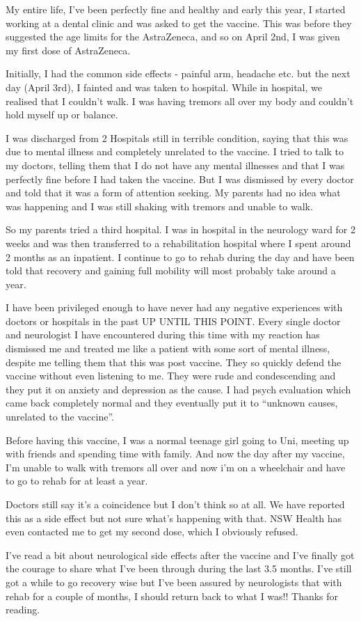 My entire life, I’ve been perfectly fine and healthy and early this year, I
started working at a dental clinic and was asked to get the vaccine. This was
before they suggested the age limits for the AstraZeneca, and so on April 2nd, I
was given my first dose of AstraZeneca.

Initially, I had the common side effects - painful arm, headache etc. but the
next day (April 3rd), I fainted and was taken to hospital. While in hospital, we
realised that I couldn’t walk. I was having tremors all over my body and
couldn’t hold myself up or balance.

I was discharged from 2 Hospitals still in terrible condition, saying that this
was due to mental illness and completely unrelated to the vaccine. I tried to
talk to my doctors, telling them that I do not have any mental illnesses and
that I was perfectly fine before I had taken the vaccine. But I was dismissed by
every doctor and told that it was a form of attention seeking. My parents had no
idea what was happening and I was still shaking with tremors and unable to
walk.

So my parents tried a third hospital. I was in hospital in the neurology ward
for 2 weeks and was then transferred to a rehabilitation hospital where I spent
around 2 months as an inpatient. I continue to go to rehab during the day and
have been told that recovery and gaining full mobility will most probably take
around a year.

I have been privileged enough to have never had any negative experiences with
doctors or hospitals in the past UP UNTIL THIS POINT. Every single doctor and
neurologist I have encountered during this time with my reaction has dismissed
me and treated me like a patient with some sort of mental illness, despite me
telling them that this was post vaccine. They so quickly defend the vaccine
without even listening to me. They were rude and condescending and they put it
on anxiety and depression as the cause. I had psych evaluation which came back
completely normal and they eventually put it to “unknown causes, unrelated to
the vaccine”.

Before having this vaccine, I was a normal teenage girl going to Uni, meeting up
with friends and spending time with family. And now the day after my vaccine,
I’m unable to walk with tremors all over and now i’m on a wheelchair and have to
go to rehab for at least a year.

Doctors still say it’s a coincidence but I don’t think so at all. We have
reported this as a side effect but not sure what’s happening with that. NSW
Health has even contacted me to get my second dose, which I obviously
refused.

I’ve read a bit about neurological side effects after the vaccine and I’ve
finally got the courage to share what I’ve been through during the last 3.5
months. I’ve still got a while to go recovery wise but I’ve been assured by
neurologists that with rehab for a couple of months, I should return back to
what I was!! Thanks for reading.

